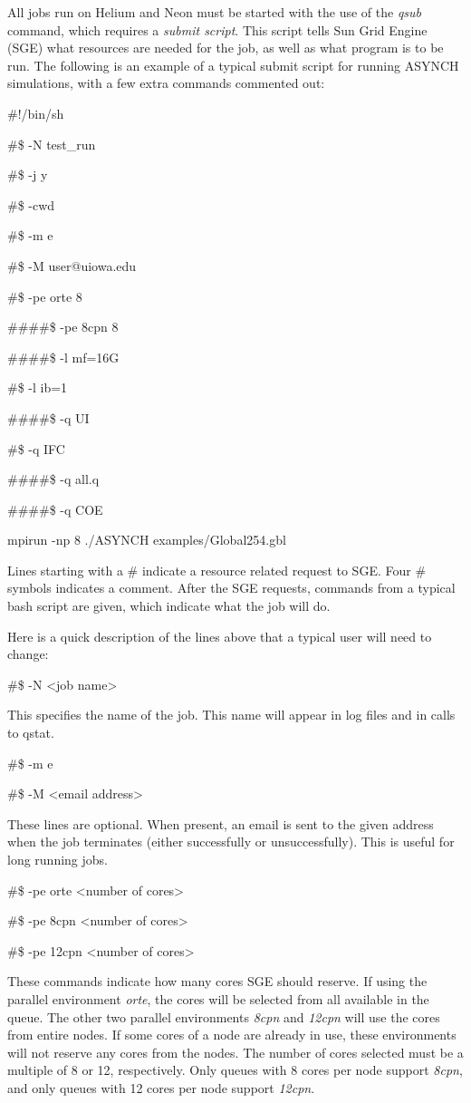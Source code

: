 \documentclass[12pt]{article}
\newenvironment{codeindent}
{\begin{list}{}
        {\setlength{\leftmargin}{.1in}}
        \item[]
}
{\end{list}}
\begin{document}
All jobs run on Helium and Neon must be started with the use of the \emph{qsub} command, which requires a \emph{submit script}. This script tells Sun Grid Engine (SGE) what resources are needed for the job, as well as what program is to be run. The following is an example of a typical submit script for running ASYNCH simulations, with a few extra commands commented out:
\begin{codeindent}
\#!/bin/sh

\#\$ -N test\_run

\#\$ -j y

\#\$ -cwd

\#\$ -m e

\#\$ -M user@uiowa.edu

\#\$ -pe orte 8

\#\#\#\#\$ -pe 8cpn 8

\#\#\#\#\$ -l mf=16G

\#\$ -l ib=1

\#\#\#\#\$ -q UI

\#\$ -q IFC

\#\#\#\#\$ -q all.q

\#\#\#\#\$ -q COE

mpirun -np 8 ./ASYNCH examples/Global254.gbl
\end{codeindent}

Lines starting with a \# indicate a resource related request to SGE. Four \# symbols indicates a comment. After the SGE requests, commands from a typical bash script are given, which indicate what the job will do.

Here is a quick description of the lines above that a typical user will need to change:

\begin{codeindent}
 \#\$ -N <job name>
\end{codeindent}
This specifies the name of the job. This name will appear in log files and in calls to qstat.

\begin{codeindent}
 \#\$ -m e

 \#\$ -M <email address>
\end{codeindent}
These lines are optional. When present, an email is sent to the given address when the job terminates (either successfully or unsuccessfully). This is useful for long running jobs.

\begin{codeindent}
 \#\$ -pe orte <number of cores>

 \#\$ -pe 8cpn <number of cores>
 
 \#\$ -pe 12cpn <number of cores>
\end{codeindent}
These commands indicate how many cores SGE should reserve. If using the parallel environment \emph{orte}, the cores will be selected from all available in the queue. The other two parallel environments \emph{8cpn} and \emph{12cpn} will use the cores from entire nodes. If some cores of a node are already in use, these environments will not reserve any cores from the nodes. The number of cores selected must be a multiple of 8 or 12, respectively. Only queues with 8 cores per node support \emph{8cpn}, and only queues with 12 cores per node support \emph{12cpn}.
\end{document}
